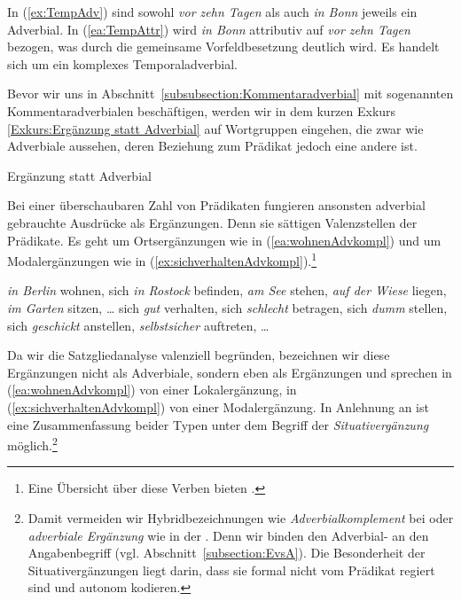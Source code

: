 In (\ref{ex:TempAdv}) sind sowohl \textit{vor zehn Tagen} als auch \textit{in Bonn} jeweils ein Adverbial. In (\ref{ea:TempAttr}) wird \textit{in Bonn} attributiv auf \textit{vor zehn Tagen} bezogen, was durch die gemeinsame Vorfeldbesetzung deutlich wird. Es handelt sich um ein komplexes Temporaladverbial.


Bevor wir uns in Abschnitt~\ref{subsubsection:Kommentaradverbial} mit sogenannten Kommentaradverbialen beschäftigen, werden wir in dem kurzen Exkurs \ref{Exkurs:Ergänzung statt Adverbial} auf Wortgruppen eingehen, die zwar wie Adverbiale aussehen, deren Beziehung zum Prädikat jedoch eine andere ist.


\begin{Exkurs}{Ergänzung statt Adverbial}\label{Exkurs:Ergänzung statt Adverbial}

Bei einer überschaubaren Zahl von Prädikaten fungieren ansonsten adverbial gebrauchte Ausdrücke als Ergänzungen. Denn sie sättigen Valenzstellen der Prädikate. Es geht um Ortsergänzungen wie in (\ref{ea:wohnenAdvkompl}) und um Modalergänzungen wie in (\ref{ex:sichverhaltenAdvkompl}).\footnote{Eine Übersicht über diese Verben bieten \citet[391--392]{HeidolphFlaemigMotsch1981}.} 

\ea \label{ea:Adverbialkomplemente}
\ea \label{ea:wohnenAdvkompl} \textit{in Berlin} wohnen, sich \textit{in Rostock} befinden, \textit{am See} stehen, \textit{auf der Wiese} liegen, \textit{im Garten} sitzen, \ldots 
\ex \label{ex:sichverhaltenAdvkompl} sich \textit{gut} verhalten, sich \textit{schlecht} betragen, sich \textit{dumm} stellen, sich \textit{geschickt} anstellen, \textit{selbstsicher} auftreten, \ldots{}
\z 
\z 

Da wir die Satzgliedanalyse valenziell begründen, bezeichnen wir diese Ergänzungen nicht als Adverbiale, sondern eben als Ergänzungen und sprechen in (\ref{ea:wohnenAdvkompl}) von einer Lokalergänzung, in (\ref{ex:sichverhaltenAdvkompl}) von einer Modalergänzung. In Anlehnung an \citet[1101]{ZifHoffStr1997} ist eine Zusammenfassung beider Typen unter dem Begriff der \textit{Situativergänzung} möglich.\footnote{Damit vermeiden wir Hybridbezeichnungen wie \textit{Adverbialkomplement} bei \citet[282]{Agel2017} oder \textit{adverbiale Ergänzung} wie in der \citet[485--486, §798]{Duden2022}. Denn wir binden den Adverbial- an den Angabenbegriff (vgl. Abschnitt~\ref{subsection:EvsA}). Die Besonderheit der Situativergänzungen liegt darin, dass sie formal nicht vom Prädikat regiert sind und autonom kodieren.}   

\end{Exkurs}


